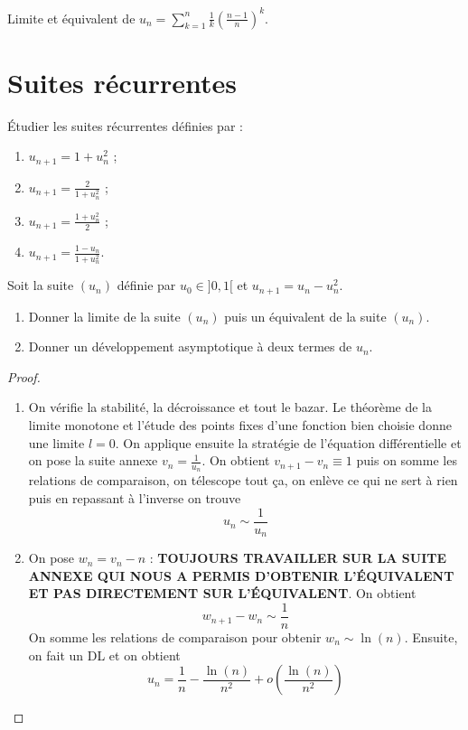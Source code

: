 \documentclass[french,a4paper]{article}
\theoremstyle{plain}
\theoremstyle{definition}
\theoremstyle{remark}
\begin{document}
\begin{ex}[Moulin.52]{}
	Limite et équivalent de $u_n=\displaystyle\sum_{k=1}^{n}\frac{1}{k}\left(\frac{n-1}{n}\right)^k$.
\end{ex}

\section{Suites récurrentes}

\begin{ex}[Moulin.53]{}
	Étudier les suites récurrentes définies par :
	\begin{enumerate}
		\item $\displaystyle u_{n+1}=1+u_n^2$ ;
		\item $\displaystyle u_{n+1}=\frac{2}{1+u_n^2}$ ;
		\item $\displaystyle u_{n+1}=\frac{1+u_n^2}{2}$ ;
		\item $\displaystyle u_{n+1}=\frac{1-u_n}{1+u_n^2}$.
	\end{enumerate}
\end{ex}

\begin{ex}[Moulin.54]{}
	Soit la suite $(u_n)$ définie par $u_0\in]0,1[$ et $u_{n+1}=u_n-u_n^2$.
	\begin{enumerate}
		\item Donner la limite de la suite $(u_n)$ puis un équivalent de la suite $(u_n)$.
		\item Donner un développement asymptotique à deux termes de $u_n$.
	\end{enumerate}
\end{ex}

\begin{proof}
	\begin{enumerate}
		\item On vérifie la stabilité, la décroissance et tout le bazar. Le théorème de la limite monotone et l'étude des points fixes d'une fonction bien choisie donne une limite $l=0$. On applique ensuite la stratégie de l'équation différentielle et on pose la suite annexe $v_n=\displaystyle\frac{1}{u_n}$. On obtient $v_{n+1}-v_n\equiv 1$ puis on somme les relations de comparaison, on télescope tout ça, on enlève ce qui ne sert à rien puis en repassant à l'inverse on trouve $$u_n\sim\frac{1}{u_n}$$
		\item On pose $w_n=v_n-n$ : \textbf{TOUJOURS TRAVAILLER SUR LA SUITE ANNEXE QUI NOUS A PERMIS D'OBTENIR L'ÉQUIVALENT ET PAS DIRECTEMENT SUR L'ÉQUIVALENT}. On obtient $$w_{n+1}-w_n\sim\frac{1}{n}$$ On somme les relations de comparaison pour obtenir $w_n\sim\ln(n)$. Ensuite, on fait un DL et on obtient $$u_n=\frac{1}{n}-\frac{\ln(n)}{n^2}+o\left(\frac{\ln(n)}{n^2}\right)$$
	\end{enumerate}
\end{proof}
\end{document}
